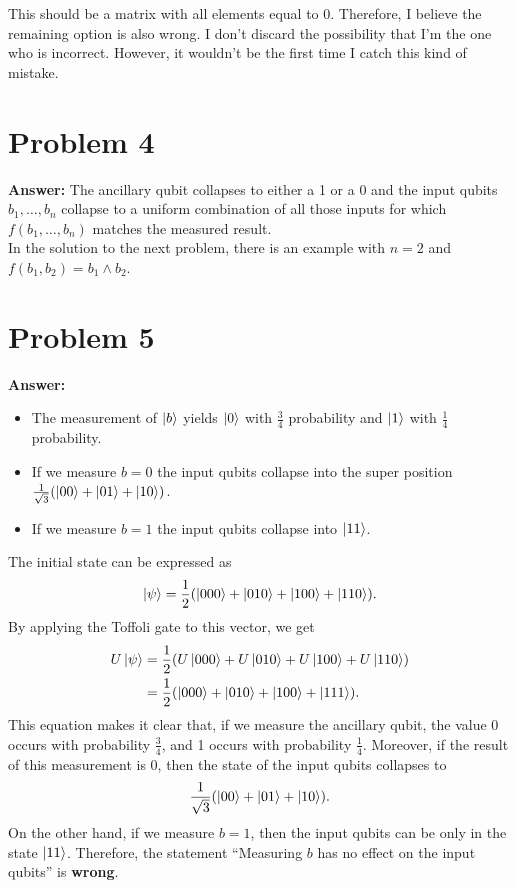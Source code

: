 \documentclass[10pt]{article}
\newcommand{\invroot}[1]{\frac{1}{\sqrt{#1}}}
\begin{document}
This should be a matrix with all elements equal to 0. Therefore, I believe the
remaining option is also wrong. I don't discard the possibility that I'm the one
who is incorrect. However, it wouldn't be the first time I catch this kind of
mistake.
\section*{Problem 4}
\label{sec:org9143ead}
\textbf{Answer:} The ancillary qubit collapses to either a 1 or a 0 and the input
qubits \(b_1,\ldots,b_n\) collapse to a uniform combination of all those
inputs for which \(f(b_1,\ldots,b_n)\) matches the measured result.\\

In the solution to the next problem, there is an example with \(n=2\) and
\(f(b_1,b_2)=b_1\wedge b_2\).
\section*{Problem 5}
\label{sec:org7168ce3}
\textbf{Answer:}
\begin{itemize}
\item The measurement of \(\ket{b}\) yields \(\ket{0}\) with \(\frac{3}{4}\)
probability and \(\ket{1}\) with \(\frac{1}{4}\) probability.
\item If we measure \(b=0\) the input qubits collapse into the super position
\(\invroot{3}(\ket{00}+\ket{01}+\ket{10})\).
\item If we measure \(b=1\) the input qubits collapse into \(\ket{11}\).\\
\end{itemize}

The initial state can be expressed as
\begin{equation}
\ket{\psi}=\frac{1}{2}(\ket{000}+\ket{010}+\ket{100}+\ket{110}).
\end{equation}
By applying the Toffoli gate to this vector, we get
\begin{align}
  \begin{split}
    U\ket{\psi}&=\frac{1}{2}(U\ket{000}+U\ket{010}+U\ket{100}+U\ket{110})\\
    &=\frac{1}{2}(\ket{000}+\ket{010}+\ket{100}+\ket{111}).
  \end{split}
\end{align}
This equation makes it clear that, if we measure the ancillary qubit, the value
0 occurs with probability \(\frac{3}{4}\), and 1 occurs with probability
\(\frac{1}{4}\). Moreover, if the result of this measurement is 0, then
the state of the input qubits collapses to
\begin{equation*}
\invroot{3}(\ket{00}+\ket{01}+\ket{10}).
\end{equation*}
On the other hand, if we measure \(b=1\), then the input qubits can be only in
the state \(\ket{11}\). Therefore, the statement ``Measuring \(b\) has no
effect on the input qubits'' is \textbf{wrong}.
\end{document}
